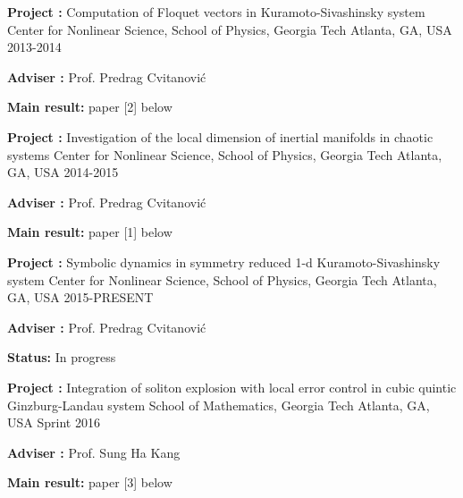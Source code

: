 


\begin{cventries}


\cventry
{\textbf{Project :} Computation of Floquet vectors in Kuramoto-Sivashinsky system} %
{Center for Nonlinear Science, School of Physics, Georgia Tech} %
{Atlanta, GA, USA} %
{2013-2014} %
{
  \begin{cvitems}
    \item {\textbf{Adviser :} Prof. Predrag Cvitanovi\'c}
    \item {\textbf{Main result:} paper [2] below}
  \end{cvitems}
}

\cventry
{\textbf{Project :} Investigation of the local dimension of inertial manifolds in chaotic systems} 
{Center for Nonlinear Science, School of Physics, Georgia Tech} 
{Atlanta, GA, USA} %
{2014-2015} %
{
  \begin{cvitems}
    \item {\textbf{Adviser :} Prof. Predrag Cvitanovi\'c}
    \item {\textbf{Main result:} paper [1] below}
  \end{cvitems}
}

\cventry
{\textbf{Project :} Symbolic dynamics in symmetry reduced 1-d Kuramoto-Sivashinsky system} 
{Center for Nonlinear Science, School of Physics, Georgia Tech} 
{Atlanta, GA, USA} %
{2015-PRESENT} %
{
  \begin{cvitems}
    \item {\textbf{Adviser :} Prof. Predrag Cvitanovi\'c}
    \item {\textbf{Status:} In progress }
  \end{cvitems}
}


\cventry
{\textbf{Project :} Integration of soliton explosion with local error control in cubic quintic 
  Ginzburg-Landau system} 
{School of Mathematics, Georgia Tech} 
{Atlanta, GA, USA} %
{Sprint 2016} %
{
  \begin{cvitems}
  \item {\textbf{Adviser :} Prof. Sung Ha Kang}
  \item {\textbf{Main result:}  paper [3] below}
  \end{cvitems}
}



\end{cventries}
